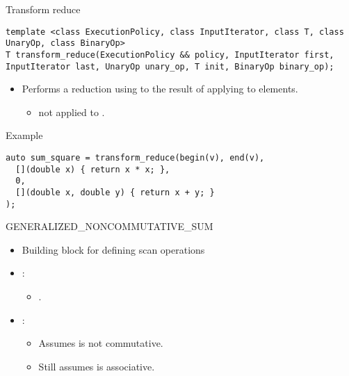 \begin{frame}[t,fragile]{Transform reduce}
\begin{lstlisting}[]
template <class ExecutionPolicy, class InputIterator, class T, class UnaryOp, class BinaryOp>
T transform_reduce(ExecutionPolicy && policy, InputIterator first, InputIterator last, UnaryOp unary_op, T init, BinaryOp binary_op);
\end{lstlisting}
\begin{itemize}
  \item Performs a reduction using  
        to the result of applying  to elements.
    \begin{itemize}
      \item {} not applied to .
    \end{itemize}
\end{itemize}
\begin{block}{Example}
\begin{lstlisting}[basicstyle=\scriptsize]
auto sum_square = transform_reduce(begin(v), end(v), 
  [](double x) { return x * x; },
  0,
  [](double x, double y) { return x + y; }
);
\end{lstlisting}
\end{block}
\end{frame}

\begin{frame}[t]{GENERALIZED\_NONCOMMUTATIVE\_SUM}
\begin{itemize}
  \item Building block for defining scan operations
  \vfill
  \item {}:
    \begin{itemize}
      \item {}.
    \end{itemize}
  \vfill
  \item {}:
    \begin{itemize}
      \item Assumes  is not commutative.
      \item Still assumes  is associative.
    \end{itemize}
\end{itemize}
\end{frame}

